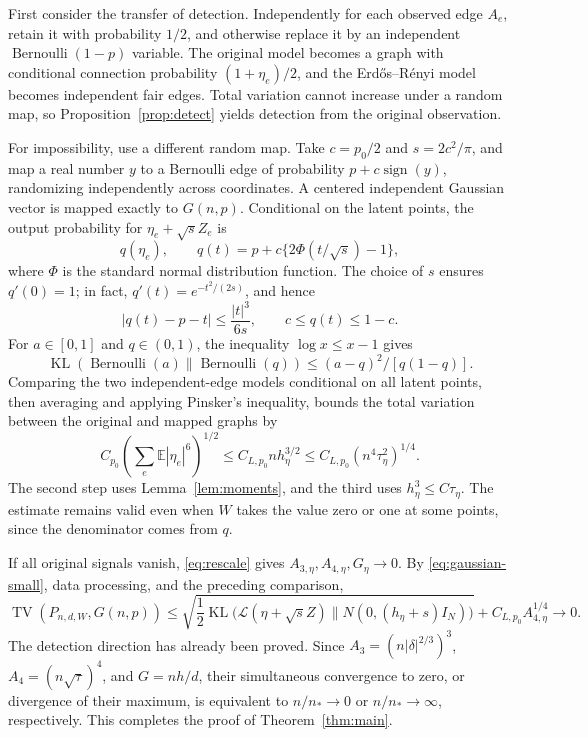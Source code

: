 \documentclass[11pt,reqno]{amsart}
\numberwithin{equation}{section}
\theoremstyle{definition}
\theoremstyle{remark}
\theoremstyle{definition}
\DeclareMathOperator{\TV}{TV}
\DeclareMathOperator{\KL}{KL}
\begin{document}
First consider the transfer of detection. Independently for each observed edge $A_e$, retain it with probability $1/2$,
and otherwise replace it by an independent $\operatorname{Bernoulli}(1-p)$ variable.
The original model becomes a graph with conditional connection probability $(1+\eta_e)/2$,
and the Erd\H{o}s--R\'enyi model becomes independent fair edges.
Total variation cannot increase under a random map, so Proposition~\ref{prop:detect} yields detection from the original observation.

For impossibility, use a different random map.
Take $c=p_0/2$ and $s=2c^2/\pi$, and map a real number $y$ to a Bernoulli edge of probability
$p+c\operatorname{sign}(y)$, randomizing independently across coordinates.
A centered independent Gaussian vector is mapped exactly to $G(n,p)$.
Conditional on the latent points, the output probability for $\eta_e+\sqrt sZ_e$ is
\[
 q(\eta_e),\qquad
 q(t)=p+c\{2\Phi(t/\sqrt s)-1\},
\]
where $\Phi$ is the standard normal distribution function.
The choice of $s$ ensures $q'(0)=1$; in fact,
$q'(t)=e^{-t^2/(2s)}$, and hence
\begin{equation}\label{eq:channel-error}
 |q(t)-p-t|\le\frac{|t|^3}{6s},\qquad c\le q(t)\le1-c.
\end{equation}
For $a\in[0,1]$ and $q\in(0,1)$, the inequality $\log x\le x-1$ gives
\[
\KL(\operatorname{Bernoulli}(a)\|\operatorname{Bernoulli}(q))
\le(a-q)^2/[q(1-q)].
\]
Comparing the two independent-edge models conditional on all latent points, then averaging and applying Pinsker's inequality,
bounds the total variation between the original and mapped graphs by
\[
 C_{p_0}\left(\sum_e\mathbb E|\eta_e|^6\right)^{1/2}
 \le C_{L,p_0}n h_\eta^{3/2}
 \le C_{L,p_0}(n^4\tau_\eta^2)^{1/4}.
\]
The second step uses Lemma~\ref{lem:moments}, and the third uses $h_\eta^3\le C\tau_\eta$.
The estimate remains valid even when $W$ takes the value zero or one at some points, since the denominator comes from $q$.

If all original signals vanish, \eqref{eq:rescale} gives
$A_{3,\eta},A_{4,\eta},G_\eta\to0$.
By \eqref{eq:gaussian-small}, data processing, and the preceding comparison,
\begin{equation}\label{eq:tv-upper}
 \TV(P_{n,d,W},G(n,p))
 \le\sqrt{\frac12\KL\bigl(\mathcal L(\eta+\sqrt sZ)\|N(0,(h_\eta+s)I_N)\bigr)}
       +C_{L,p_0}A_{4,\eta}^{1/4}\longrightarrow0.
\end{equation}
The detection direction has already been proved. Since
$A_3=(n|\delta|^{2/3})^3$, $A_4=(n\sqrt\tau)^4$, and $G=nh/d$,
their simultaneous convergence to zero, or divergence of their maximum, is equivalent to $n/n_*\to0$ or $n/n_*\to\infty$, respectively.
This completes the proof of Theorem~\ref{thm:main}.
\end{document}
